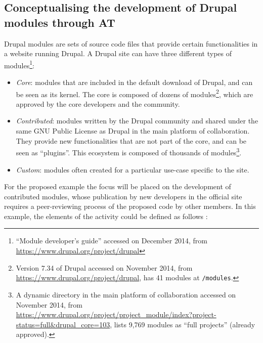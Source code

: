 \documentclass[a4paper, 12pt]{article}
\begin{document}
\subsection{Conceptualising the development of Drupal modules through AT}
\label{subsec:modules-concept}

Drupal modules are sets of source code files that provide certain functionalities in a website running Drupal. A Drupal site can have three different types of modules\footnote{``Module developer's guide'' accessed on  December 2014, from \url{https://www.drupal.org/project/drupal}}:

\begin{itemize}
	\item \textit{Core}: modules that are included in the default download of Drupal, and can be seen as its kernel. The core is composed of dozens of modules\footnote{Version 7.34 of Drupal accessed on  November 2014, from \url{https://www.drupal.org/project/drupal}, has 41 modules at \texttt{/modules}.}, which are approved by the core developers and the community. 
	\item \textit{Contributed}: modules written by the Drupal community and shared under the same GNU Public License as Drupal in the main platform of collaboration. They provide new functionalities that are not part of the core, and can be seen as ``plugins''. This ecosystem is composed of thousands of modules\footnote{A dynamic directory in the main platform of collaboration accessed on  November 2014, from \url{https://www.drupal.org/project/project_module/index?project-status=full&drupal_core=103}, lists 9,769 modules as ``full projects'' (already approved).}.
	\item \textit{Custom}: modules often created for a particular use-case specific to the site.
\end{itemize}

For the proposed example the focus will be placed on the development of contributed modules, whose publication by new developers in the official site requires a peer-reviewing process of the proposed code by other members. In this example, the elements of the activity could be defined as follows \parencite{rozas2014}:
\end{document}
